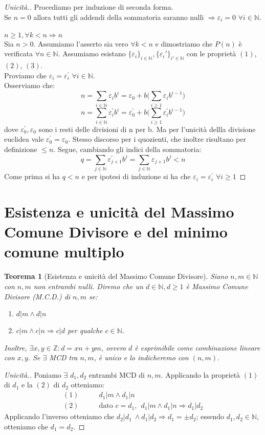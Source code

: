 \documentclass[12pt,twoside]{article}
\newcommand{\N}{\mathbb{N}}
\newcommand{\Z}{\mathbb{Z}}
\newcommand{\implica}{\Longrightarrow}
\newcommand{\nin}{\forall n\in\N}
\newcommand{\eps}{\varepsilon}
\newcommand{\pr}{\prime}
\renewcommand\qedsymbol{$\blacksquare$}
\newcommand{\baseinduz}[1]{\newline\newline {\boldmath$n = #1$}}
\newcommand{\induzdue}[1]{\\\\{\boldmath$n \ge #1, \forall k < n \implica n$}}
\newtheorem{theorem}{Teorema}
\begin{document}
\renewcommand\qedsymbol{$\blacksquare$}
\begin{proof}[Unicità.]
Procediamo per induzione di seconda forma.
\baseinduz{0}
\\Se $n = 0$ allora tutti gli addendi della sommatoria saranno nulli $\implica \eps_i = 0$ $\forall i \in \N$.
\induzdue{1}
\\ Sia $n > 0$. Assumiamo l'asserto sia vero $\forall k < n$ e dimostriamo che $P(n)$ è verificata $\nin$.
Assumiamo esistano $\{\eps_i\}_{i\in\N}, \{\eps_i'\}_{i' \in\N}$ con le proprietà $(1)$, $(2)$, $(3)$.\\Proviamo che $\eps_i = \eps_{i}^{\pr}$ $\forall i \in \N$.
\\Osserviamo che:
$$n =\sum_{i\in\N} \eps_i b^i = \eps_0 + b\Bigg( \sum_{i \ge 1} \eps_i b^{i-1}\Bigg)$$
$$n =\sum_{i\in\N} \eps_{i}^{\pr} b^i = \eps_{0}^{\pr} + b\Bigg( \sum_{i \ge 1} \eps_{i}^{\pr} b^{i-1}\Bigg)$$
dove $\eps_{0}^{\pr},\eps_{0}$ sono i resti delle divisioni di n per b. Ma per l'unicità dellla divisione euclidea vale $\eps_{0}^{\pr} = \eps_{0}$. Stesso discorso per i quozienti, che inoltre risultano per definizione $\le n$. Segue, cambiando gli indici della sommatoria:
\\$$q = \sum_{j\in\N} \eps_{j+1}^{\pr} b^j = \sum_{j\in\N} \eps_{j+1} b^j < n $$
Come prima si ha $q < n$ e per ipotesi di induzione si ha che $\eps_i = \eps_{i}^{\pr}$ $\forall i \ge 1$
\end{proof}

\section{Esistenza e unicità del Massimo Comune Divisore e del minimo comune multiplo}
\begin{theorem}[Esistenza e unicità del Massimo Comune Divisore]
Siano $n, m \in \N$ con $n, m$ non entrambi nulli. Diremo che un $d \in \N, d \ge 1$ è Massimo Comune Divisore (M.C.D.) di $n, m$ se:
\begin{enumerate}
\item$d | m \land d | n $
\item$c | m \land c | n \implica c | d$ per qualche $c \in \N$.
\end{enumerate}
Inoltre, $\exists x, y \in \Z : d = xn + ym$, ovvero $d$ è esprimibile come combinazione lineare con $x, y$.  Se $\exists$ MCD tra $n, m$, è unico e lo indicheremo con $(n, m)$.
\end{theorem}

\renewcommand\qedsymbol{$\square$}
\begin{proof}[Unicità.]
Poniamo $\exists$ $d_1, d_2$ entrambi MCD di $n, m$. Applicando la proprietà $(1)$ di $d_1$ e la $(2)$ di $d_2$ otteniamo:
\begin{align*}
(1)\qquad& d_1 | m \land d_1 | n \\
(2)\qquad& \text{dato }c = d_1, \ \ d_1 | m \land d_1 | n \implica d_1 | d_2
\end{align*}
Applicando l'inverso otteniamo che $d_2 | d_1\ \land d_1 | d_2 \implica d_1 = \pm d_2$; essendo $d_1, d_2 \in \N$, otteniamo che
$ d_1 = d_2$.
\end{proof}
\end{document}
